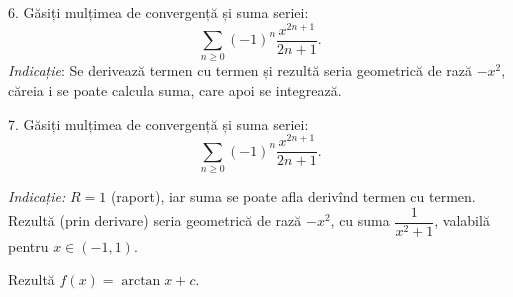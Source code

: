 6. Găsiți mulțimea de convergență și suma seriei:
\[
  \sum_{n \geq 0} (-1)^n \frac{x^{2n+1}}{2n + 1}.
\]
\emph{Indicație}: Se derivează termen cu termen și rezultă seria
geometrică de rază $ -x^2 $, căreia i se poate calcula suma, care apoi
se integrează.

\vspace{1cm}

7.  Găsiți mulțimea de convergență și suma seriei:
\[
  \sum_{n \geq 0} (-1)^n \dfrac{x^{2n + 1}}{2n + 1}.
\]

\emph{Indicație:} $ R = 1 $ (raport), iar suma se poate afla derivînd
termen cu termen. Rezultă (prin derivare) seria geometrică de rază $ -x^2 $,
cu suma $ \dfrac{1}{x^2 + 1} $, valabilă pentru $ x \in (-1, 1) $.

Rezultă $ f(x) = \arctan x + c $.

